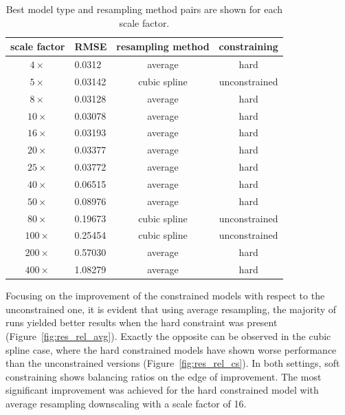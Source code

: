 \begin{table}[htbp]
    \centering
    \begin{tabular}{|c|l|c|c|}
        \hline
         \textbf{scale factor} &  \textbf{RMSE} & \textbf{resampling method} & \textbf{constraining} \\
         \hline \hline
         $4\times$ & 0.0312 & average & hard \\ \hline 
         $5\times$ & 0.03142 & cubic spline & unconstrained \\ \hline 
         $8\times$ & 0.03128 & average & hard \\ \hline 
         $10\times$ & 0.03078 & average & hard \\ \hline 
         $16\times$ & 0.03193 & average & hard \\ \hline 
         $20\times$ & 0.03377 & average & hard \\ \hline 
         $25\times$ & 0.03772 & average & hard \\ \hline 
         $40\times$ & 0.06515 & average & hard \\ \hline 
         $50\times$ & 0.08976 & average & hard \\ \hline 
         $80\times$ & 0.19673 & cubic spline & unconstrained \\ \hline 
         $100\times$ & 0.25454 & cubic spline & unconstrained \\ \hline 
         $200\times$ & 0.57030 & average & hard \\ \hline 
         $400\times$ & 1.08279 & average & hard \\ \hline 
    \end{tabular}
    \caption[Best models for each scale factor]{Best model type and resampling method pairs are shown for each scale factor.}
    \label{tab:best_for_scale_factor}
\end{table}

Focusing on the improvement of the constrained models with respect to the unconstrained one, it is evident that using average resampling, the majority of runs yielded better results when the hard constraint was present (Figure~\ref{fig:res_rel_avg}).
Exactly the opposite can be observed in the cubic spline case, where the hard constrained models have shown worse performance than the unconstrained versions (Figure~\ref{fig:res_rel_cs}).
In both settings, soft constraining shows balancing ratios on the edge of improvement.
The most significant improvement was achieved for the hard constrained model with average resampling downscaling with a scale factor of 16.

